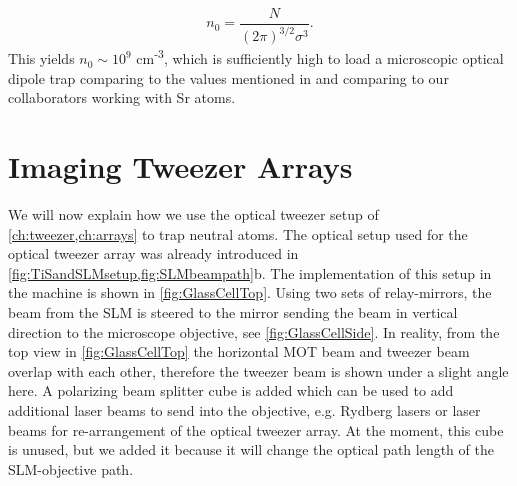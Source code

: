 \begin{equation}
    n_0 = \frac{N}{(2\pi)^{3/2}\sigma^3}.
\end{equation}
This yields $n_0 \sim 10^9$ cm\textsuperscript{-3}, which is sufficiently high to load a microscopic optical dipole trap comparing to the values mentioned in \cite{Schlosser2002} and comparing to our collaborators working with Sr atoms.


\section{Imaging Tweezer Arrays}\label{sec:Tweezers}

We will now explain how we use the optical tweezer setup of \cref{ch:tweezer,ch:arrays} to trap neutral atoms. 
The optical setup used for the optical tweezer array was already introduced in \cref{fig:TiSandSLMsetup,fig:SLMbeampath}b.
The implementation of this setup in the machine is shown in \cref{fig:GlassCellTop}.
Using two sets of relay-mirrors, the beam from the \ac{SLM} is steered to the mirror sending the beam in vertical direction to the microscope objective, see \cref{fig:GlassCellSide}. 
In reality, from the top view in \cref{fig:GlassCellTop} the horizontal MOT beam and tweezer beam overlap with each other, therefore the tweezer beam is shown under a slight angle here.
A polarizing beam splitter cube is added which can be used to add additional laser beams to send into the objective, e.g. Rydberg lasers or laser beams for re-arrangement of the optical tweezer array. 
At the moment, this cube is unused, but we added it because it will change the optical path length of the SLM-objective path.

